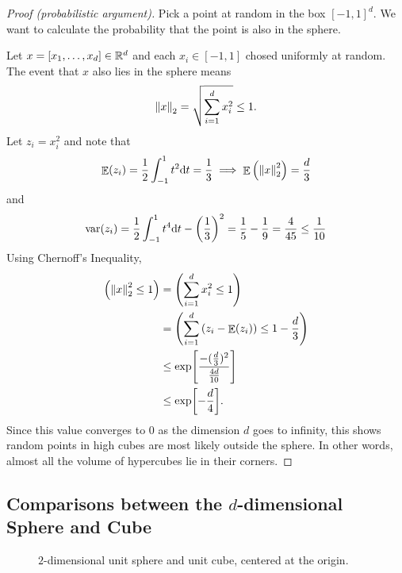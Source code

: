 \documentclass[12pt]{article}
\DeclareMathOperator*{\E}{\mathbb{E}}
\let\Pr\relax
\DeclareMathOperator*{\Pr}{\mathbb{P}}
\newcommand{\R}{\mathbb{R}}
\begin{document}
\begin{proof}[Proof (probabilistic argument)]
  Pick a point at random in the box $[-1,1]^d$.  We want to calculate the probability that the point is also in the sphere.

  Let $x = \qty[x_1, \dots, x_d] \in \R^d$ and each $x_i \in [-1,1]$ chosed uniformly at random.  The event that $x$ also lies in the sphere means $$\norm{x}_2 = \sqrt{\sum_{i=1}^d x_i^2} \leq 1.$$  Let $z_i = x_i^2$ and note that
  \begin{align*}
    \E(z_i) = \frac{1}{2}\int_{-1}^1 t^2 \dd t = \frac{1}{3} \implies \E\qty(\norm{x}_2^2) = \frac{d}{3}
  \end{align*}
  and
  \begin{align*}
    \text{var}(z_i) = \frac{1}{2}\int_{-1}^1 t^4 \dd t - \qty(\frac{1}{3})^2 = \frac{1}{5} - \frac{1}{9} = \frac{4}{45} \leq \frac{1}{10}
  \end{align*}
  Using Chernoff's Inequality,
  \begin{align*}
    \Pr\qty(\norm{x}_2^2 \leq 1) &= \Pr\qty(\sum_{i=1}^d x_i^2 \leq 1) \\
    &= \Pr\qty(\sum_{i=1}^d \qty(z_i - \E(z_i)) \leq 1 - \frac{d}{3}) \\
    &\leq \exp[\frac{-(\frac{d}{3})^2}{\frac{4d}{10}}] \\
    &\leq \exp[-\frac{d}{4}].
  \end{align*}
  Since this value converges to $0$ as the dimension $d$ goes to infinity, this shows random points in high cubes are most likely outside the sphere.  In other words, almost all the volume of hypercubes lie in their corners.
\end{proof}

\subsection{Comparisons between the $d$-dimensional Sphere and Cube}

\begin{figure}[ht!]
  \centering
  \caption{$2$-dimensional unit sphere and unit cube, centered at the origin.}
  \label{2dim}
\end{figure}
\end{document}
